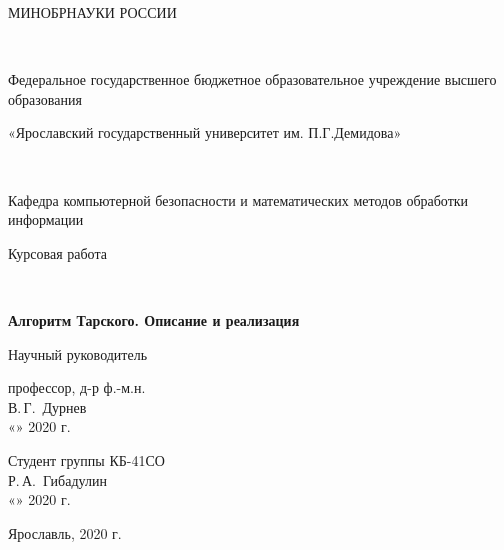 \begin{titlepage}
    \begin{center}
        {\large МИНОБРНАУКИ РОССИИ
            
            ~
            
            Федеральное государственное бюджетное образовательное учреждение высшего образования
                
            «Ярославский государственный университет им. П.Г.Демидова»
            
            ~
            
            Кафедра компьютерной безопасности и
            математических методов обработки информации}
        \vfill
        
        {\large Курсовая работа}
        
        ~
        
        \textbf{{\large Алгоритм Тарского. Описание и реализация}}
    \end{center}
    \vfill
    
    \newlength{\ML}
    \hfill\begin{minipage}{0.4\textwidth}
        Научный руководитель
        
        профессор, д-р ф.-м.н.
        \\
        \underline{\hspace{\ML}} В.\,Г.~Дурнев\\
        «\underline{\hspace{0.7cm}}» \underline{\hspace{2cm}} 2020 г.
    \end{minipage}%
    \bigskip
    
    \hfill\begin{minipage}{0.4\textwidth}
        Студент группы КБ-41СО
        \\
        \underline{\hspace{\ML}} Р.\,А.~Гибадулин\\
        «\underline{\hspace{0.7cm}}» \underline{\hspace{2cm}} 2020 г.
    \end{minipage}%
    \vfill
    
    \begin{center}
        Ярославль, 2020 г.
    \end{center}
\end{titlepage}